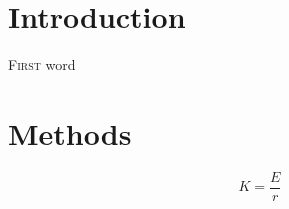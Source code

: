 \documentclass[12pt]{extarticle}
\begin{document}
\newpage

\section{Introduction}

\lettrine[lines=3,lraise=0.1, nindent=0em]{F}{irst} word \lipsum[1]


\lipsum[1]

\section{Methods}
\lipsum[1]

\begin{equation}
K = \frac{E}{r}
\end{equation}
\end{document}
